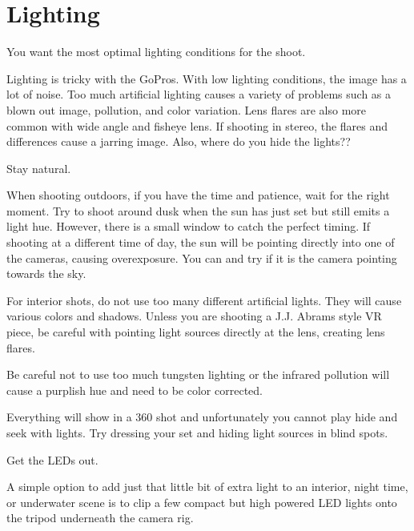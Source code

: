 \section{Lighting}
\pagecolor{white}
\label{chap:25}
\begin{fullwidth}

\problem

{\large You want the most optimal lighting conditions for the shoot. \par}

Lighting is tricky with the GoPros. With low lighting conditions, the image has a lot of noise. Too much artificial lighting causes a variety of problems such as a blown out image, pollution, and color variation. Lens flares are also more common with wide angle and fisheye lens. If shooting in stereo, the flares and differences cause a jarring image. Also, where do you hide the lights??

\solution

{\large Stay natural. \par}

When shooting outdoors, if you have the time and patience, wait for the right moment. Try to shoot around dusk when the sun has just set but still emits a light hue. However, there is a small window to catch the perfect timing. If shooting at a different time of day, the sun will be pointing directly into one of the cameras, causing overexposure. You can \textbf{} and try \textbf{} if it is the camera pointing towards the sky. 

For interior shots, do not use too many different artificial lights. They will cause various colors and shadows. Unless you are shooting a J.J. Abrams style VR piece, be careful with pointing light sources directly at the lens, creating lens flares.

Be careful not to use too much tungsten lighting or the infrared pollution will cause a purplish hue and need to be color corrected. 


Everything will show in a 360 shot and unfortunately you cannot play hide and seek with lights. Try dressing your set and hiding light sources in blind spots. 


{\large Get the LEDs out. \par}

A simple option to add just that little bit of extra light to an interior, night time, or underwater scene is to clip a few compact but high powered LED lights onto the tripod underneath the camera rig.


\end{fullwidth}
